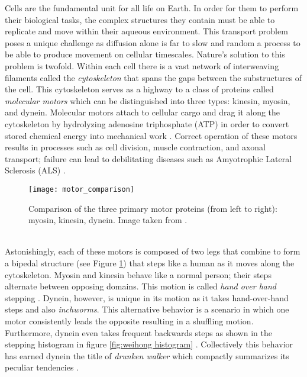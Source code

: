 Cells are the fundamental unit for all life on Earth. In order
for them to perform their biological tasks, the complex structures they contain
must be able to replicate and move within their aqueous environment. This
transport problem  poses a unique challenge as diffusion alone is far to slow
and random a process to be able to produce movement on cellular timescales.
Nature's solution to this problem is twofold. Within each cell there is a vast network of interweaving filaments called the \textit{cytoskeleton} that spans the gaps between the substructures of the cell. This cytoskeleton serves as a highway to a class of proteins called \textit{molecular motors} which can be distinguished into three types: kinesin, myosin, and dynein. Molecular motors attach to cellular cargo and drag it along the cytoskeleton by hydrolyzing adenosine triphosphate (ATP) in order to convert stored chemical energy into mechanical work \cite{alberts2002molecular}. Correct operation of these motors results in processes such as cell division, muscle contraction, and axonal transport; failure can lead to debilitating diseases such as Amyotrophic Lateral Sclerosis (ALS) \cite{boillee2006disease}. 
\begin{figure}[!hbt]
	\centering 
	\texttt{[image: motor\_comparison]}
	\caption[Motor protein structure]{Comparison of the three primary motor proteins (from left to right): myosin, kinesin, dynein. Image taken from \cite{philips__nodate}.}
	\label{fig:motor proteins} 
\end{figure}
{}\\

Astonishingly, each of these motors is composed of two legs that combine to form a bipedal structure (see Figure \ref{fig:motor proteins}) that steps like a human as it moves along the cytoskeleton. Myosin and kinesin behave like a normal person; their steps alternate between opposing domains. This motion is called \textit{hand over hand} stepping \cite{goldman2009drunk}. Dynein, however, is unique in its motion as it takes hand-over-hand steps and also \textit{inchworms}. This alternative behavior is a scenario in which one motor consistently leads the opposite resulting in a shuffling motion. Furthermore, dynein even takes frequent backwards steps as shown in the stepping histogram in figure \ref{fig:weihong histogram} \cite{qiu2012dynein}. Collectively this behavior has earned dynein the title of \textit{drunken walker} which compactly summarizes its peculiar tendencies \cite{goldman2009drunk}. \\

